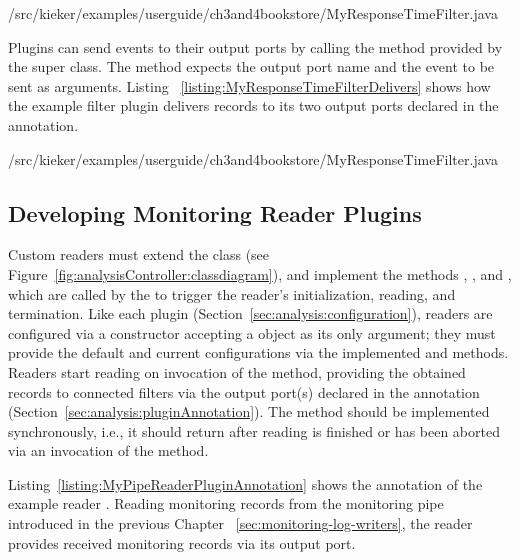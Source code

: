 \setJavaCodeListing
%
{\customComponentsBookstoreApplicationDir/src/kieker/examples/userguide/ch3and4bookstore/MyResponseTimeFilter.java}

\noindent Plugins can send events to their output ports by calling the %
 method provided by the super class. The method expects the %
output port name and the event to be sent as arguments. Listing~%
\ref{listing:MyResponseTimeFilterDelivers} %
shows how the example filter plugin  delivers records %
to its two output ports declared in the  annotation.

\setJavaCodeListing
%
{\customComponentsBookstoreApplicationDir/src/kieker/examples/userguide/ch3and4bookstore/MyResponseTimeFilter.java}


\subsection{Developing Monitoring Reader Plugins}\label{sec:analysis:reader}

\noindent Custom readers must extend the class %
 (see Figure~\ref{fig:analysisController:classdiagram}), %
and implement the methods , , and , %
which are called by the  to trigger the reader's initialization, %
reading, and termination. Like each plugin (Section~\ref{sec:analysis:configuration}), %
readers are configured via a constructor accepting a  object %
as its only argument; they must provide the default and current configurations %
via the implemented  and  %
methods. Readers start reading on invocation of the  method, %
providing the obtained records to connected filters via the output port(s) %
declared in the  annotation (Section~\ref{sec:analysis:pluginAnnotation}). %
The  method should be implemented synchronously, i.e., it should %
return after reading is finished or has been aborted via an invocation of the %
 method.

Listing~\ref{listing:MyPipeReaderPluginAnnotation} shows the  %
annotation  of the example reader . Reading monitoring %
records from the monitoring pipe introduced in the previous Chapter~%
\ref{sec:monitoring-log-writers}, the reader provides received monitoring %
records via its output port.

